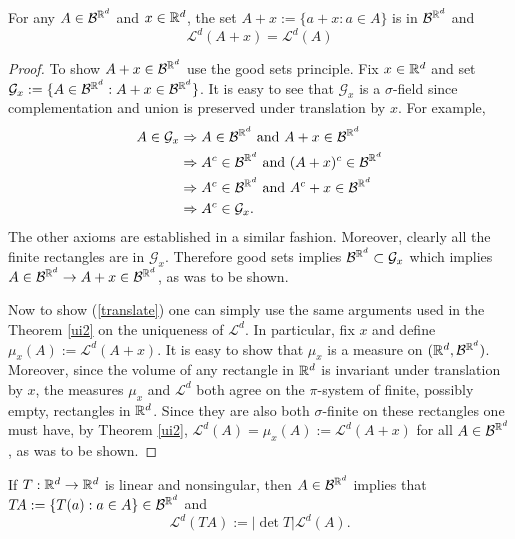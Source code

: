\begin{theorem}
For any $A\in\mathcal  B^{\Bbb R^d}$ and $x\in \Bbb R^d$, the set $A+x:= \{ a+x: a\in A\}$ is in $\mathcal B^{\Bbb R^d }$ and
\begin{equation}
 \label{translate}
 \mathcal L^d(A+x) =  \mathcal L^d(A)
 \end{equation}
\end{theorem}
\begin{proof}
To show $A+x \in\mathcal B^{\Bbb R^d }$ use the good sets principle. Fix $x\in \Bbb R^d$ and set   $\mathcal G_x:=\{ A\in \mathcal B^{\Bbb R^d }:  A+x \in \mathcal B^{\Bbb R^d }\}$.
It is easy to see that $\mathcal G_x$ is a $\sigma$-field since complementation and union is preserved under translation by $x$. For example,
\begin{align*}
A\in\mathcal G_x &\Rightarrow  A\in \mathcal B^{\Bbb R^d } \text{  and } A+x \in \mathcal B^{\Bbb R^d } \\
&\Rightarrow  A^c\in \mathcal B^{\Bbb R^d } \text{  and } (A+x)^c \in \mathcal B^{\Bbb R^d } \\
&\Rightarrow  A^c\in \mathcal B^{\Bbb R^d } \text{  and } A^c+x \in \mathcal B^{\Bbb R^d } \\
&\Rightarrow A^c\in\mathcal G_x.
\end{align*}
The other axioms are established in a similar fashion.
Moreover, clearly all the finite rectangles are in $\mathcal G_x$. Therefore good sets implies $\mathcal B^{\Bbb R^d } \subset \mathcal G_x$  which implies $A\in \mathcal B^{\Bbb R^d }\rightarrow A+x \in \mathcal B^{\Bbb R^d }$, as was to be shown.

Now to show (\ref{translate}) one can simply use the same arguments used in the Theorem \ref{ui2} on the uniqueness of $\mathcal L^d$. In particular, fix $x$ and define $\mu_x(A):= \mathcal L^d(A+x)$. It is easy to show that $\mu_x$ is a measure on $(\Bbb R^d, \mathcal B^{\Bbb R^d })$. Moreover, since the volume of any rectangle in $\Bbb R^d$ is invariant under translation by $x$, the measures $\mu_x$ and $\mathcal L^d$ both agree on the $\pi$-system of finite, possibly empty, rectangles in $\Bbb R^d$. Since they are also both $\sigma$-finite on these rectangles one must have, by Theorem \ref{ui2}, $\mathcal L^d(A) =\mu_x(A):= \mathcal L^d(A+x) $ for all $A\in\mathcal B^{\Bbb R^d }$, as was to be shown.
\end{proof}

\begin{theorem}
If $T:\Bbb R^d\rightarrow \Bbb R^d$ is linear and nonsingular, then $A\in\mathcal B^{\Bbb R^d}$ implies that $T\!A:=\{ T(a): a\in A\}\in \mathcal B^{\Bbb R^d}$ and
\[ \mathcal L^d(T\!A):=|\det T |\mathcal L^d(A). \]
\end{theorem}

